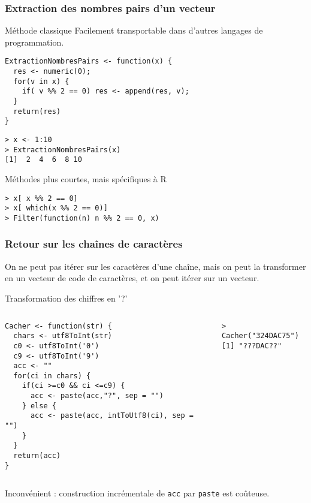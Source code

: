 \documentclass[10pt]{beamer}
\begin{document}
\begin{frame}[fragile]
  \frametitle{Extraction des nombres pairs d'un vecteur}
  \begin{block}{Méthode classique}
    Facilement transportable dans d'autres langages de programmation.
    \begin{lstlisting}[style=editor]
ExtractionNombresPairs <- function(x) {
  res <- numeric(0);
  for(v in x) {
    if( v %% 2 == 0) res <- append(res, v);
  }
  return(res)
}
\end{lstlisting}
\begin{lstlisting}
> x <- 1:10
> ExtractionNombresPairs(x)
[1]  2  4  6  8 10
\end{lstlisting}
  \end{block}

  \begin{block}{Méthodes plus courtes, mais spécifiques à R}
\begin{lstlisting}[style=block]
> x[ x %% 2 == 0]
> x[ which(x %% 2 == 0)]
> Filter(function(n) n %% 2 == 0, x)
\end{lstlisting}

  \end{block}
\end{frame}


\begin{frame}[fragile]
  \frametitle{Retour sur les chaînes de caractères}
  On ne peut pas itérer sur les caractères d'une chaîne, mais on peut la transformer en un vecteur de code de caractères, et on peut itérer sur un vecteur.

  \begin{exampleblock}{Transformation des chiffres en '?'}
\begin{columns}[c]
\begin{column}{0.66\textwidth}
    \begin{lstlisting}[style=edblock]
Cacher <- function(str) {
  chars <- utf8ToInt(str)
  c0 <- utf8ToInt('0')
  c9 <- utf8ToInt('9')
  acc <- ""
  for(ci in chars) {
    if(ci >=c0 && ci <=c9) {
      acc <- paste(acc,"?", sep = "")
    } else {
      acc <- paste(acc, intToUtf8(ci), sep = "")
    }
  }
  return(acc)
}
\end{lstlisting}
\end{column}
\begin{column}{0.34\textwidth}
  \begin{lstlisting}
> Cacher("324DAC75")
[1] "???DAC??"
\end{lstlisting}
\end{column}
\end{columns}
\alert{Inconvénient : construction incrémentale de \texttt{acc} par \texttt{paste} est coûteuse.}
  \end{exampleblock}
\end{frame}
\end{document}
